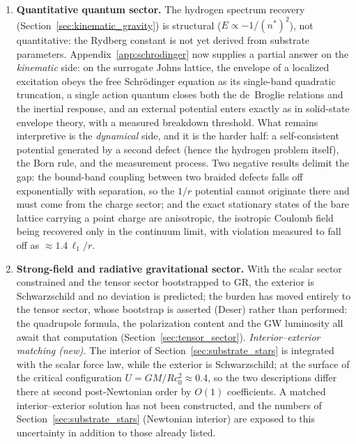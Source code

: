 \documentclass[11pt,a4paper]{article}
\theoremstyle{plain}
\theoremstyle{remark}
\begin{document}
\begin{enumerate}
    \item \textbf{Quantitative quantum sector.} The hydrogen spectrum recovery (Section~\ref{sec:kinematic_gravity}) is structural ($E \propto -1/(n^*)^2$), not quantitative: the Rydberg constant is not yet derived from substrate parameters. Appendix~\ref{app:schrodinger} now supplies a partial answer on the \emph{kinematic} side: on the surrogate Johns lattice, the envelope of a localized excitation obeys the free Schr\"odinger equation as its single-band quadratic truncation, a single action quantum closes both the de~Broglie relations and the inertial response, and an external potential enters exactly as in solid-state envelope theory, with a measured breakdown threshold. What remains interpretive is the \emph{dynamical} side, and it is the harder half: a self-consistent potential generated by a second defect (hence the hydrogen problem itself), the Born rule, and the measurement process. Two negative results delimit the gap: the bound-band coupling between two braided defects falls off exponentially with separation, so the $1/r$ potential cannot originate there and must come from the charge sector; and the exact stationary states of the bare lattice carrying a point charge are anisotropic, the isotropic Coulomb field being recovered only in the continuum limit, with violation measured to fall off as $\approx 1.4\,\ell_1/r$.
    \item \textbf{Strong-field and radiative gravitational sector.} With the scalar sector constrained and the tensor sector bootstrapped to GR, the exterior is Schwarzschild and no deviation is predicted; the burden has moved entirely to the tensor sector, whose bootstrap is asserted (Deser) rather than performed: the quadrupole formula, the polarization content and the GW luminosity all await that computation (Section~\ref{sec:tensor_sector}). \emph{Interior--exterior matching (new).} The interior of Section~\ref{sec:substrate_stars} is integrated with the scalar force law, while the exterior is Schwarzschild; at the surface of the critical configuration $U = GM/Rc_0^2 \approx 0.4$, so the two descriptions differ there at second post-Newtonian order by $O(1)$ coefficients. A matched interior--exterior solution has not been constructed, and the numbers of Section~\ref{sec:substrate_stars} (Newtonian interior) are exposed to this uncertainty in addition to those already listed.

\end{enumerate}
\end{document}
